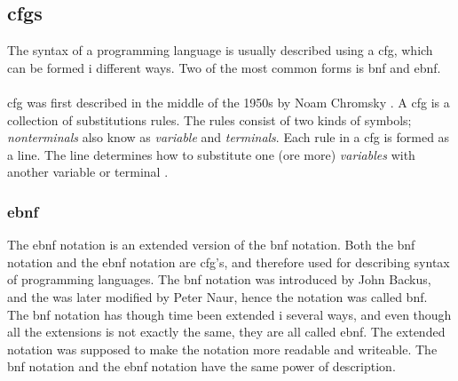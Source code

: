 \subsection{\ac{cfgs}}
\label{sec:cfg}
The syntax of a programming language is usually described using a \ac{cfg}, which can be formed i different ways. Two of the most common forms is \ac{bnf} and \ac{ebnf}. \\
\\
\ac{cfg} was first described in the middle of the 1950s by Noam Chromsky \cite{concepts_prog_lang}. A \ac{cfg} is a collection of substitutions rules. The rules consist of two kinds of symbols; \textit{nonterminals} also know as \textit{variable} and \textit{terminals}. Each rule in a \ac{cfg} is formed as a line. The line determines how to substitute one (ore more) \textit{variables} with another variable or terminal \cite{syntax_book}.

\subsubsection*{\ac{ebnf}}
\label{sec:ebnf}
The \ac{ebnf} notation is an extended version of the \ac{bnf} notation. Both the \ac{bnf} notation and the \ac{ebnf} notation are \ac{cfg}'s, and therefore used for describing syntax of programming languages. The \ac{bnf} notation was introduced by John Backus, and the was later modified by Peter Naur, hence the notation was called \ac{bnf}. \\
The \ac{bnf} notation has though time been extended i several ways, and even though all the extensions is not exactly the same, they are all called \ac{ebnf}. The extended notation was supposed to make the notation more readable and writeable. The \ac{bnf} notation and the \ac{ebnf} notation have the same power of description. \cite{concepts_prog_lang}


